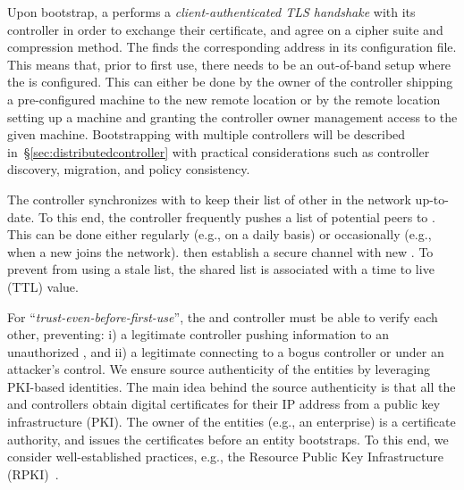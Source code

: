 Upon bootstrap, a \tp performs a \textit{client-authenticated TLS handshake} with its
controller in order to exchange their certificate, and agree on a cipher suite and compression
method. The \tp finds the corresponding address in its configuration file. This means
that, prior to first use, there needs to be an out-of-band setup where the \tp is
configured. This can either be done by the owner of the controller shipping a pre-configured
machine to the new remote location or by the remote location setting up a machine and
granting the controller owner management access to the given machine. Bootstrapping \tps
with multiple controllers will be described in~\S\ref{sec:distributedcontroller} with
practical considerations such as controller discovery, \tp migration, and policy consistency.

The controller synchronizes with \tps to keep their list of other \tps in the network 
up-to-date. To this end, the controller frequently pushes a list of potential peers to \tps.
This can be done either regularly (e.g., on a daily basis) or occasionally
(e.g., when a new \tp joins the network).
\tps then establish a secure channel with new \tps. To prevent \tps from using a stale \tp list,
the shared \tp list is associated with a time to live (TTL) value. 

For ``\textit{trust-even-before-first-use}'', 
the \tps and controller must be able to verify each 
other, preventing: i) a legitimate controller pushing information to an unauthorized \tp, 
and ii) a legitimate \tp connecting to a bogus controller or \tp under an attacker's control.
We ensure source authenticity of the \name entities by leveraging PKI-based identities.
The main idea behind the source authenticity is that all the \tps and controllers obtain
digital certificates for their IP address from a public key infrastructure (PKI). The owner
of the entities (e.g., an enterprise) is a certificate authority, and issues the certificates
before an entity bootstraps. To this end, we consider well-established practices, e.g.,
the Resource Public Key Infrastructure (RPKI)~\cite{rfc7115,rfc6810}.


